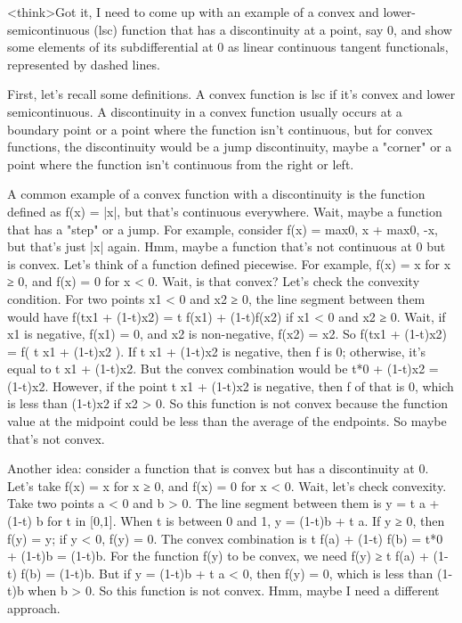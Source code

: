 <think>Got it, I need to come up with an example of a convex and lower-semicontinuous (lsc) function that has a discontinuity at a point, say 0, and show some elements of its subdifferential at 0 as linear continuous tangent functionals, represented by dashed lines. 

First, let's recall some definitions. A convex function is lsc if it's convex and lower semicontinuous. A discontinuity in a convex function usually occurs at a boundary point or a point where the function isn't continuous, but for convex functions, the discontinuity would be a jump discontinuity, maybe a "corner" or a point where the function isn't continuous from the right or left. 

A common example of a convex function with a discontinuity is the function defined as f(x) = |x|, but that's continuous everywhere. Wait, maybe a function that has a "step" or a jump. For example, consider f(x) = max{0, x} + max{0, -x}, but that's just |x| again. Hmm, maybe a function that's not continuous at 0 but is convex. Let's think of a function defined piecewise. For example, f(x) = x for x ≥ 0, and f(x) = 0 for x < 0. Wait, is that convex? Let's check the convexity condition. For two points x1 < 0 and x2 ≥ 0, the line segment between them would have f(tx1 + (1-t)x2) = t f(x1) + (1-t)f(x2) if x1 < 0 and x2 ≥ 0. Wait, if x1 is negative, f(x1) = 0, and x2 is non-negative, f(x2) = x2. So f(tx1 + (1-t)x2) = f( t x1 + (1-t)x2 ). If t x1 + (1-t)x2 is negative, then f is 0; otherwise, it's equal to t x1 + (1-t)x2. But the convex combination would be t*0 + (1-t)x2 = (1-t)x2. However, if the point t x1 + (1-t)x2 is negative, then f of that is 0, which is less than (1-t)x2 if x2 > 0. So this function is not convex because the function value at the midpoint could be less than the average of the endpoints. So maybe that's not convex.

Another idea: consider a function that is convex but has a discontinuity at 0. Let's take f(x) = x for x ≥ 0, and f(x) = 0 for x < 0. Wait, let's check convexity. Take two points a < 0 and b > 0. The line segment between them is y = t a + (1-t) b for t in [0,1]. When t is between 0 and 1, y = (1-t)b + t a. If y ≥ 0, then f(y) = y; if y < 0, f(y) = 0. The convex combination is t f(a) + (1-t) f(b) = t*0 + (1-t)b = (1-t)b. For the function f(y) to be convex, we need f(y) ≥ t f(a) + (1-t) f(b) = (1-t)b. But if y = (1-t)b + t a < 0, then f(y) = 0, which is less than (1-t)b when b > 0. So this function is not convex. Hmm, maybe I need a different approach.

